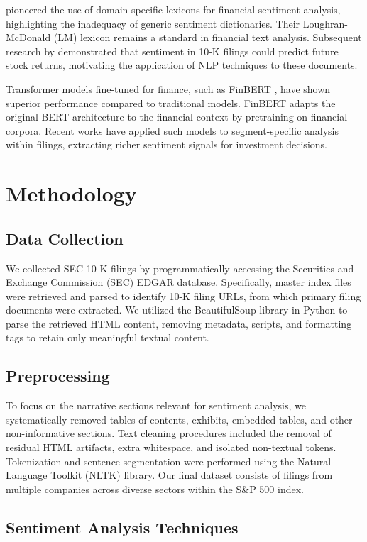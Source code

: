 \documentclass[12pt]{article}
\begin{document}
\citet{Loughran2011} pioneered the use of domain-specific lexicons for financial sentiment analysis, highlighting the inadequacy of generic sentiment dictionaries. Their Loughran-McDonald (LM) lexicon remains a standard in financial text analysis. Subsequent research by \citet{Li2010} demonstrated that sentiment in 10-K filings could predict future stock returns, motivating the application of NLP techniques to these documents.

Transformer models fine-tuned for finance, such as FinBERT \citep{Araci2019}, have shown superior performance compared to traditional models. FinBERT adapts the original BERT architecture to the financial context by pretraining on financial corpora. Recent works \citep{Huang2020} have applied such models to segment-specific analysis within filings, extracting richer sentiment signals for investment decisions.

\section{Methodology}

\subsection{Data Collection}
We collected SEC 10-K filings by programmatically accessing the Securities and Exchange Commission (SEC) EDGAR database. Specifically, master index files were retrieved and parsed to identify 10-K filing URLs, from which primary filing documents were extracted. We utilized the BeautifulSoup library in Python to parse the retrieved HTML content, removing metadata, scripts, and formatting tags to retain only meaningful textual content.

\subsection{Preprocessing}
To focus on the narrative sections relevant for sentiment analysis, we systematically removed tables of contents, exhibits, embedded tables, and other non-informative sections. Text cleaning procedures included the removal of residual HTML artifacts, extra whitespace, and isolated non-textual tokens. Tokenization and sentence segmentation were performed using the Natural Language Toolkit (NLTK) library. Our final dataset consists of filings from multiple companies across diverse sectors within the S\&P 500 index.

\subsection{Sentiment Analysis Techniques}
\end{document}
